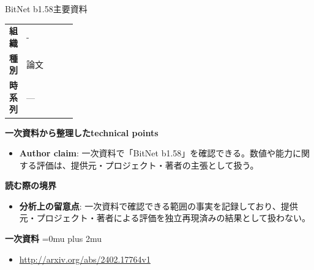 \begin{technicalnote}{BitNet b1.58}{主要資料}
\begingroup
\begin{tabularx}{\linewidth}{@{}>{\bfseries}p{0.22\linewidth}X@{}}
組織 & - \\
種別 & 論文 \\
時系列 & — \\
\end{tabularx}
\smallskip
{\bfseries 一次資料から整理したtechnical points}
\begin{itemize}[leftmargin=1.5em,itemsep=0.35em]
\item \textbf{Author claim}: 一次資料で「BitNet b1.58」を確認できる。数値や能力に関する評価は、提供元・プロジェクト・著者の主張として扱う。
\end{itemize}
\begin{minipage}{\linewidth}
{\bfseries 読む際の境界}
\begin{itemize}[leftmargin=1.5em,itemsep=0.35em]
\item \textbf{分析上の留意点}: 一次資料で確認できる範囲の事実を記録しており、提供元・プロジェクト・著者による評価を独立再現済みの結果として扱わない。
\end{itemize}
\begin{samepage}
{\bfseries 一次資料}
\begingroup\sloppy
\Urlmuskip=0mu plus 2mu\relax
\begin{itemize}[leftmargin=1.5em,itemsep=0.25em]
\item {\scriptsize\url{http://arxiv.org/abs/2402.17764v1}}
\end{itemize}
\endgroup
\end{samepage}
\end{minipage}
\endgroup
\end{technicalnote}
\medskip

